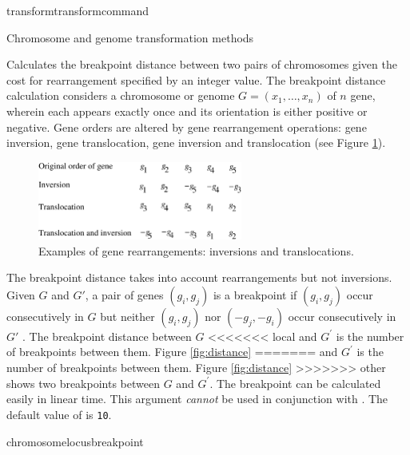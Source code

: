 \begin{command}{transform}{transformcommand}
\begin{arguments}
\begin{argumentgroup}{Chromosome and genome transformation methods}
{\begin{statement}
                {Calculates the breakpoint distance \cite{blanchetteetal1997}
                between two pairs of chromosomes given the cost for rearrangement
                specified by an integer value.  The breakpoint distance calculation considers
                a chromosome or genome $G = (x_1, \ldots, x_n) $ of $n$ gene, wherein each
                appears exactly once and its orientation is either positive or negative.  Gene
                orders are altered by gene rearrangement operations: gene inversion, gene translocation,
                gene inversion and translocation (see Figure \ref{fig:genomeRearrangement}).  
                \bigskip
                \begin{figure} [!htbp]
                    \begin{center}
                        \includegraphics[width=0.6\textwidth]{doc/figures/genomeRearrangement.pdf}
                    \end{center}
                    \caption{Examples of gene rearrangements: inversions and translocations.}
                    \label{fig:genomeRearrangement}
                \end{figure}

                The breakpoint distance takes into account rearrangements but not inversions.
                Given $G$ and $G'$, a pair of genes $(g_i, g_j)$ is a breakpoint if $(g_i, g_j)$ occur 
                consecutively in $G$ but neither $(g_i, g_j)$ nor $(-g_j, -g_i)$ occur
                consecutively in $G'$  \cite{sankoffandblanchette1998}.  The breakpoint distance between $G$
<<<<<<< local
	      and $G^\prime$ is the number of breakpoints between them.  Figure \ref{fig:distance} 
=======
                and $G^\prime$ is the number of breakpoints between them.  Figure \ref{fig:distance} 
>>>>>>> other
                shows two breakpoints between $G$ and $G^\prime$. The breakpoint can be calculated 
                easily in linear time.  This argument \emph{cannot} be used in
                conjunction with . %
                The default value of  is \texttt{10}.} 
                {chromosomelocusbreakpoint} 
        

\end{statement}}
\end{argumentgroup}
\end{arguments}
\end{command}
